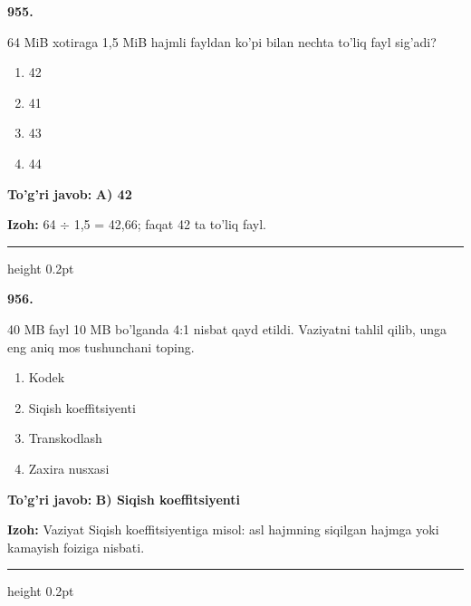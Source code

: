 \documentclass[10pt,a4paper,oneside]{article}
\begin{document}
\noindent\textbf{\color{ink}955.}
\par
64 MiB xotiraga 1,5 MiB hajmli fayldan ko'pi bilan nechta to'liq fayl sig'adi?
\begin{enumerate}[label=\Alph*),leftmargin=9mm]
\item 42
\item 41
\item 43
\item 44
\end{enumerate}
\begin{tcolorbox}[enhanced,breakable,colback=teal!4,colframe=teal!50!black,boxrule=0.5pt,arc=1.1mm,left=3mm,right=3mm,top=1.7mm,bottom=1.7mm,before skip=2mm,after skip=2mm]
\textbf{\color{teal}To'g'ri javob:} \textbf{A) 42}
\par\smallskip
\textbf{Izoh:} 64 \ensuremath{\div} 1,5 = 42,66; faqat 42 ta to'liq fayl.
\end{tcolorbox}
\vspace{2mm}\hrule height 0.2pt \vspace{3mm}

\noindent\textbf{\color{ink}956.}
\par
40 MB fayl 10 MB bo'lganda 4:1 nisbat qayd etildi. Vaziyatni tahlil qilib, unga eng aniq mos tushunchani toping.
\begin{enumerate}[label=\Alph*),leftmargin=9mm]
\item Kodek
\item Siqish koeffitsiyenti
\item Transkodlash
\item Zaxira nusxasi
\end{enumerate}
\begin{tcolorbox}[enhanced,breakable,colback=teal!4,colframe=teal!50!black,boxrule=0.5pt,arc=1.1mm,left=3mm,right=3mm,top=1.7mm,bottom=1.7mm,before skip=2mm,after skip=2mm]
\textbf{\color{teal}To'g'ri javob:} \textbf{B) Siqish koeffitsiyenti}
\par\smallskip
\textbf{Izoh:} Vaziyat Siqish koeffitsiyentiga misol: asl hajmning siqilgan hajmga yoki kamayish foiziga nisbati.
\end{tcolorbox}
\vspace{2mm}\hrule height 0.2pt \vspace{3mm}
\end{document}
